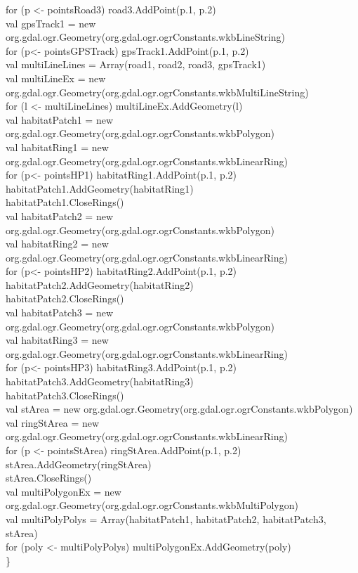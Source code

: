 \documentclass {article}
\begin{document}
\begin{appendices}
for (p <- pointsRoad3) road3.AddPoint(p.\underline{\space}1, p.\underline{\space}2)\\
val gpsTrack1 = new org.gdal.ogr.Geometry(org.gdal.ogr.ogrConstants.wkbLineString)\\
for (p<- pointsGPSTrack) gpsTrack1.AddPoint(p.\underline{\space}1, p.\underline{\space}2)\\
val multiLineLines = Array(road1, road2, road3, gpsTrack1)\\
val multiLineEx = new org.gdal.ogr.Geometry(org.gdal.ogr.ogrConstants.wkbMultiLineString)\\
for (l <- multiLineLines) multiLineEx.AddGeometry(l)\\
val habitatPatch1 = new org.gdal.ogr.Geometry(org.gdal.ogr.ogrConstants.wkbPolygon)\\
val habitatRing1 = new org.gdal.ogr.Geometry(org.gdal.ogr.ogrConstants.wkbLinearRing)\\
for (p<- pointsHP1) habitatRing1.AddPoint(p.\underline{\space}1, p.\underline{\space}2)\\
habitatPatch1.AddGeometry(habitatRing1)\\
habitatPatch1.CloseRings()\\
val habitatPatch2 = new org.gdal.ogr.Geometry(org.gdal.ogr.ogrConstants.wkbPolygon)\\
val habitatRing2 = new org.gdal.ogr.Geometry(org.gdal.ogr.ogrConstants.wkbLinearRing)\\
for (p<- pointsHP2) habitatRing2.AddPoint(p.\underline{\space}1, p.\underline{\space}2)\\
habitatPatch2.AddGeometry(habitatRing2)\\
habitatPatch2.CloseRings()\\
val habitatPatch3 = new org.gdal.ogr.Geometry(org.gdal.ogr.ogrConstants.wkbPolygon)\\
val habitatRing3 = new org.gdal.ogr.Geometry(org.gdal.ogr.ogrConstants.wkbLinearRing)\\
for (p<- pointsHP3) habitatRing3.AddPoint(p.\underline{\space}1, p.\underline{\space}2)\\
habitatPatch3.AddGeometry(habitatRing3)\\
habitatPatch3.CloseRings()\\
val stArea = new org.gdal.ogr.Geometry(org.gdal.ogr.ogrConstants.wkbPolygon)\\
val ringStArea = new org.gdal.ogr.Geometry(org.gdal.ogr.ogrConstants.wkbLinearRing)\\
for (p <- pointsStArea) ringStArea.AddPoint(p.\underline{\space}1, p.\underline{\space}2)\\
stArea.AddGeometry(ringStArea)\\
stArea.CloseRings()\\
val multiPolygonEx = new org.gdal.ogr.Geometry(org.gdal.ogr.ogrConstants.wkbMultiPolygon)\\
val multiPolyPolys = Array(habitatPatch1, habitatPatch2, habitatPatch3, stArea)\\
for (poly <- multiPolyPolys) multiPolygonEx.AddGeometry(poly)\\
\}
\\
\\

\end{appendices}
\end{document}
